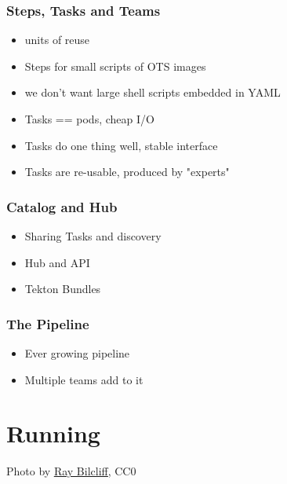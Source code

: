 \documentclass[aspectratio=169,11pt,hyperref={colorlinks=true}]{beamer}
\begin{document}
\begin{grayframe}
  \frametitle{Steps, Tasks and Teams}
  \begin{itemize}
    \item units of reuse
    \item Steps for small scripts of OTS images
    \item we don't want large shell scripts embedded in YAML
    \item Tasks == pods, cheap I/O
    \item Tasks do one thing well, stable interface
    \item Tasks are re-usable, produced by "experts"
  \end{itemize}
\end{grayframe}

\begin{grayframe}
  \frametitle{Catalog and Hub}
  \begin{itemize}
    \item Sharing Tasks and discovery
    \item Hub and API
    \item Tekton Bundles
  \end{itemize}
\end{grayframe}

\begin{grayframe}
  \frametitle{The Pipeline}
  \begin{itemize}
    \item Ever growing pipeline
    \item Multiple teams add to it
  \end{itemize}
\end{grayframe}

\section[Running]{Running}

\begin{sectionwithpic}{Photo by \href{https://www.pexels.com/@raybilcliff}{\underline{Ray Bilcliff}}, CC0}
\end{sectionwithpic}
\end{document}
